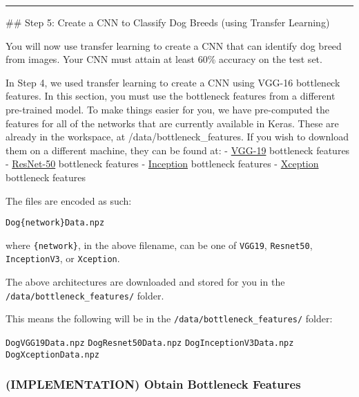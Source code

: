 \documentclass[11pt]{article}
\begin{document}
    \begin{center}\rule{0.5\linewidth}{\linethickness}\end{center}

 \#\# Step 5: Create a CNN to Classify Dog Breeds (using Transfer
Learning)

You will now use transfer learning to create a CNN that can identify dog
breed from images. Your CNN must attain at least 60\% accuracy on the
test set.

In Step 4, we used transfer learning to create a CNN using VGG-16
bottleneck features. In this section, you must use the bottleneck
features from a different pre-trained model. To make things easier for
you, we have pre-computed the features for all of the networks that are
currently available in Keras. These are already in the workspace, at
/data/bottleneck\_features. If you wish to download them on a different
machine, they can be found at: -
\href{https://s3-us-west-1.amazonaws.com/udacity-aind/dog-project/DogVGG19Data.npz}{VGG-19}
bottleneck features -
\href{https://s3-us-west-1.amazonaws.com/udacity-aind/dog-project/DogResnet50Data.npz}{ResNet-50}
bottleneck features -
\href{https://s3-us-west-1.amazonaws.com/udacity-aind/dog-project/DogInceptionV3Data.npz}{Inception}
bottleneck features -
\href{https://s3-us-west-1.amazonaws.com/udacity-aind/dog-project/DogXceptionData.npz}{Xception}
bottleneck features

The files are encoded as such:

\begin{verbatim}
Dog{network}Data.npz
\end{verbatim}

where \texttt{\{network\}}, in the above filename, can be one of
\texttt{VGG19}, \texttt{Resnet50}, \texttt{InceptionV3}, or
\texttt{Xception}.

The above architectures are downloaded and stored for you in the
\texttt{/data/bottleneck\_features/} folder.

This means the following will be in the
\texttt{/data/bottleneck\_features/} folder:

\texttt{DogVGG19Data.npz} \texttt{DogResnet50Data.npz}
\texttt{DogInceptionV3Data.npz} \texttt{DogXceptionData.npz}

\subsubsection{(IMPLEMENTATION) Obtain Bottleneck
Features}\label{implementation-obtain-bottleneck-features}
\end{document}
